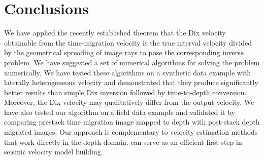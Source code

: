 \section{Conclusions}

We have applied the recently established theorem that the Dix velocity
obtainable from the time-migration velocity is the true interval
velocity divided by the geometrical spreading of image rays to pose
the corresponding inverse problem. We have suggested a set of
numerical algorithms for solving the problem numerically. We have
tested these algorithms on a synthetic data example with laterally
heterogeneous velocity and demonstrated that they produce
significantly better results than simple Dix inversion followed by
time-to-depth conversion. Moreover, the Dix velocity may qualitatively
differ from the output velocity. We have also tested our algorithm on a
field data example and validated it by comparing prestack time
migration image mapped to depth with post-stack depth migrated
images. Our approach is complementary to velocity estimation methods
that work directly in the depth domain. 
can serve as an efficient first step in seismic velocity model
building.





